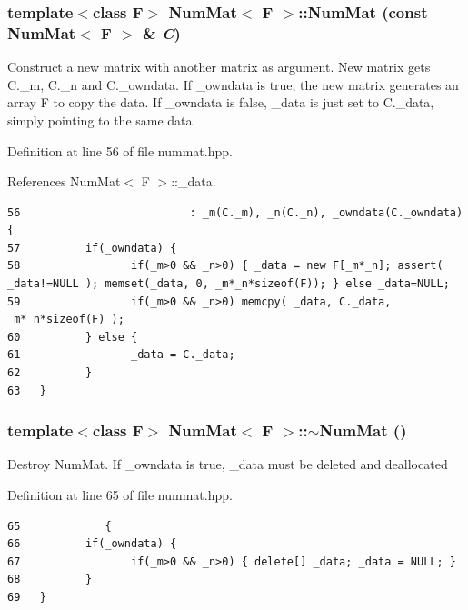 \subsubsection{\setlength{\rightskip}{0pt plus 5cm}template$<$class F$>$ {\bf Num\-Mat}$<$ F $>$::{\bf Num\-Mat} (const {\bf Num\-Mat}$<$ F $>$ \& {\em C})\hspace{0.3cm}{\tt  [inline]}}\label{classNumMat_4b3436a830e943717b773e03eebf08b7_4b3436a830e943717b773e03eebf08b7}


Construct a new matrix with another matrix as argument. New matrix gets C.\_\-m, C.\_\-n and C.\_\-owndata. If \_\-owndata is true, the new matrix generates an array F to copy the data. If \_\-owndata is false, \_\-data is just set to C.\_\-data, simply pointing to the same data 

Definition at line 56 of file nummat.hpp.

References Num\-Mat$<$ F $>$::\_\-data.

\footnotesize\begin{verbatim}56                          : _m(C._m), _n(C._n), _owndata(C._owndata) {
57          if(_owndata) {
58                 if(_m>0 && _n>0) { _data = new F[_m*_n]; assert( _data!=NULL ); memset(_data, 0, _m*_n*sizeof(F)); } else _data=NULL;
59                 if(_m>0 && _n>0) memcpy( _data, C._data, _m*_n*sizeof(F) );
60          } else {
61                 _data = C._data;
62          }
63   }
\end{verbatim}\normalsize 


\subsubsection{\setlength{\rightskip}{0pt plus 5cm}template$<$class F$>$ {\bf Num\-Mat}$<$ F $>$::$\sim${\bf Num\-Mat} ()\hspace{0.3cm}{\tt  [inline]}}\label{classNumMat_2de3b0b2c141a45e3738519e8732710a_2de3b0b2c141a45e3738519e8732710a}


Destroy Num\-Mat. If \_\-owndata is true, \_\-data must be deleted and deallocated 

Definition at line 65 of file nummat.hpp.

\footnotesize\begin{verbatim}65             { 
66          if(_owndata) { 
67                 if(_m>0 && _n>0) { delete[] _data; _data = NULL; } 
68          }
69   }
\end{verbatim}\normalsize 




